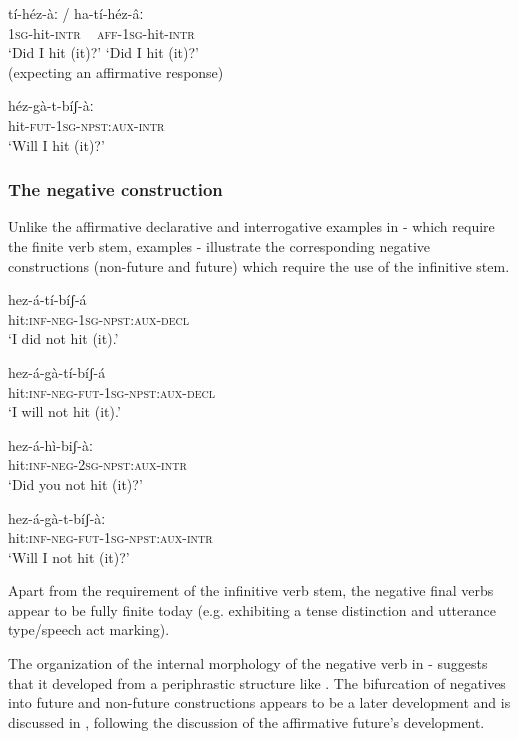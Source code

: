 \documentclass[output=paper]{langsci/langscibook}
\begin{document}
\ea\label{ex:mahland:54}
\gll tí-héz-àː       /    ha-tí-héz-âː\\
\textsc{1sg}{}-hit-\textsc{intr}   ~  \textsc{aff-1sg}{}-hit-\textsc{intr}\\
\glt `Did I hit (it)?'      `Did I hit (it)?' \\
(expecting an affirmative response)
\z

\ea\label{ex:mahland:55}
\gll héz-gà-t-bíʃ-àː\\
hit-\textsc{fut-1sg-npst:aux-intr}\\
\glt `Will I hit (it)?'
\z

\subsubsection{The negative construction}\label{sec:mahland:3.1.1}

Unlike the affirmative declarative and interrogative examples in - which require the finite verb stem, examples - illustrate the corresponding negative constructions (non-future and future) which require the use of the infinitive stem.

\ea\label{ex:mahland:56}
\gll hez-á-tí-bíʃ-á\\
hit:\textsc{inf-neg-1sg-npst:aux-decl} \\
\glt `I did not hit (it).'
\z

\ea\label{ex:mahland:57}
\gll hez-á-gà-tí-bíʃ-á\\
hit:\textsc{inf-neg-fut-1sg-npst:aux-decl} \\
\glt `I will not hit (it).'
\z

\ea\label{ex:mahland:58}
\gll hez-á-hì-biʃ-àː\\
hit:\textsc{inf-neg-2sg-npst:aux-intr}\\
\glt `Did you not hit (it)?'
\z

\ea\label{ex:mahland:59}
\gll hez-á-gà-t-bíʃ-àː\\
hit:\textsc{inf-neg-fut-1sg-npst:aux-intr}\\
\glt `Will I not hit (it)?'
\z

Apart from the requirement of the infinitive verb stem, the negative final verbs appear to be fully finite today (e.g. exhibiting a tense distinction and utterance type/speech act marking). 

The organization of the internal morphology of the negative verb in - suggests that it developed from a periphrastic structure like . The bifurcation of negatives into future and non-future constructions appears to be a later development and is discussed in , following the discussion of the affirmative future's development.
\end{document}
